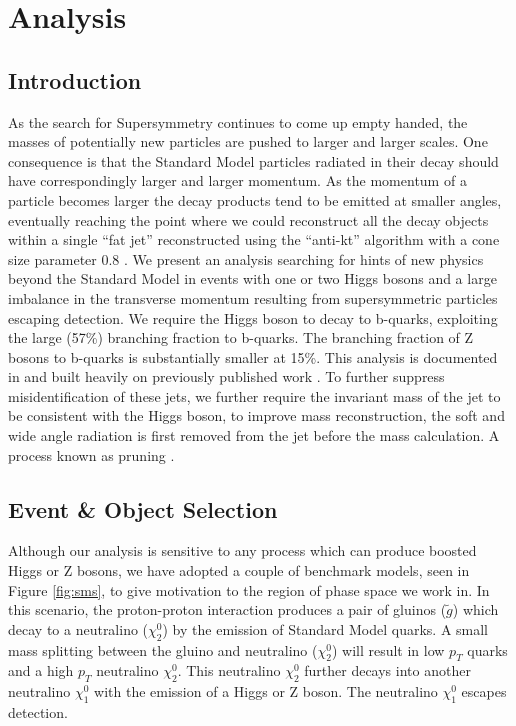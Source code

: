 \chapter{Analysis}

\section{Introduction}

As the search for Supersymmetry continues to come up empty handed, the masses of potentially new particles are pushed to larger and larger scales. One consequence is that the Standard Model particles radiated in their decay should have correspondingly larger and larger momentum. As the momentum of a particle becomes larger the decay products tend to be emitted at smaller angles, eventually reaching the point where we could reconstruct all the decay objects within a single ``fat jet'' reconstructed using the ``anti-kt'' algorithm with a cone size parameter 0.8 \cite{1126-6708-2008-04-063}. We present an analysis searching for hints of new physics beyond the Standard Model in events with one or two Higgs bosons and a large imbalance in the transverse momentum resulting from supersymmetric particles escaping detection. We require the Higgs boson to decay to b-quarks, exploiting the large (57\%) branching fraction to b-quarks. The branching fraction of Z bosons to b-quarks is substantially smaller at 15\%. This analysis is documented in \cite{2016152} and built heavily on previously published work \cite{PhysRevD.96.032003} \cite{Sirunyan:2017bsh}. To further suppress misidentification of these jets, we further require the invariant mass of the jet to be consistent with the Higgs boson, to improve mass reconstruction, the soft and wide angle radiation is first removed from the jet before the mass calculation. A process known as pruning \cite{PhysRevD.81.094023}.

\section{Event \& Object Selection}

Although our analysis is sensitive to any process which can produce boosted Higgs or Z bosons, we have adopted a couple of benchmark models, seen in Figure \ref{fig:sms}, to give motivation to the region of phase space we work in. In this scenario, the proton-proton interaction produces a pair of gluinos ($\tilde{g}$) which decay to a neutralino ($\chi_{2}^{0}$) by the emission of Standard Model quarks. A small mass splitting between the gluino and neutralino ($\chi_{2}^{0}$) will result in low $p_{T}$ quarks and a high $p_{T}$ neutralino $\chi_{2}^{0}$. This neutralino $\chi_{2}^{0}$ further decays into another neutralino $\chi_{1}^{0}$ with the emission of a Higgs or Z boson. The neutralino $\chi_{1}^{0}$ escapes detection.

